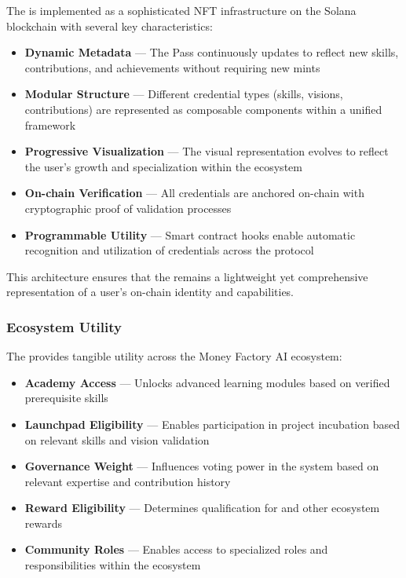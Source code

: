 The  is implemented as a sophisticated NFT infrastructure on the Solana blockchain with several key characteristics:

\begin{itemize}
    \item \textbf{Dynamic Metadata} — The Pass continuously updates to reflect new skills, contributions, and achievements without requiring new mints
    
    \item \textbf{Modular Structure} — Different credential types (skills, visions, contributions) are represented as composable components within a unified framework
    
    \item \textbf{Progressive Visualization} — The visual representation evolves to reflect the user's growth and specialization within the ecosystem
    
    \item \textbf{On-chain Verification} — All credentials are anchored on-chain with cryptographic proof of validation processes
    
    \item \textbf{Programmable Utility} — Smart contract hooks enable automatic recognition and utilization of credentials across the protocol
\end{itemize}

This architecture ensures that the  remains a lightweight yet comprehensive representation of a user's on-chain identity and capabilities.

\subsubsection*{Ecosystem Utility}

The  provides tangible utility across the Money Factory AI ecosystem:

\begin{itemize}
    \item \textbf{Academy Access} — Unlocks advanced learning modules based on verified prerequisite skills
    
    \item \textbf{Launchpad Eligibility} — Enables participation in project incubation based on relevant skills and vision validation
    
    \item \textbf{Governance Weight} — Influences voting power in the  system based on relevant expertise and contribution history
    
    \item \textbf{Reward Eligibility} — Determines qualification for  and other ecosystem rewards
    
    \item \textbf{Community Roles} — Enables access to specialized roles and responsibilities within the ecosystem
\end{itemize}

